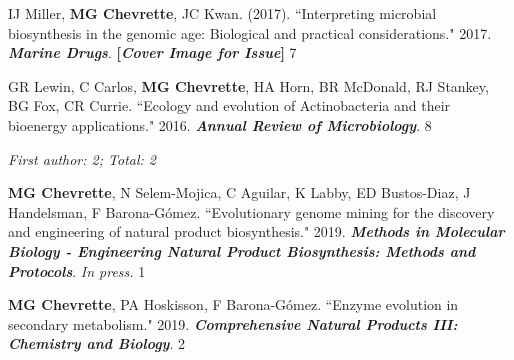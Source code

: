 \begin{cvpubs}
\cvpub
{IJ Miller, \textbf{MG Chevrette}, JC Kwan. (2017). ``Interpreting microbial biosynthesis in the genomic age: Biological and practical considerations." 2017. \textit{\textbf{Marine Drugs}}. \textbf{\textit{}} \linebreak \textbf{[\textit{Cover Image for Issue}]}}
{7}

\cvpub
{GR Lewin, C Carlos, \textbf{MG Chevrette}, HA Horn, BR McDonald, RJ Stankey, BG Fox, CR Currie. ``Ecology and evolution of Actinobacteria and their bioenergy applications." 2016. \textit{\textbf{Annual Review of Microbiology}}. \textbf{\textit{}}}
{8}

\end{cvpubs}


\newpage

 \vspace{-2mm}

\begin{cvpubs}

\cvpub
{\hspace{-1cm} \textit{First author: 2; Total: 2}}
{}

\cvpub
{\textbf{MG Chevrette}, N Selem-Mojica, C Aguilar, K Labby, ED Bustos-Diaz, J Handelsman, F Barona-G\'{o}mez. ``Evolutionary genome mining for the discovery and engineering of natural product biosynthesis." 2019. \textit{\textbf{Methods in Molecular Biology - Engineering Natural Product Biosynthesis: Methods and Protocols}}. \textit{In press.}}
{1}

\cvpub
{\textbf{MG Chevrette}, PA Hoskisson, F Barona-G\'{o}mez. ``Enzyme evolution in secondary metabolism." 2019. \textit{\textbf{Comprehensive Natural Products III: Chemistry and Biology}}. \textbf{\textit{}}}
{2}

\end{cvpubs}


 \vspace{-2mm}

